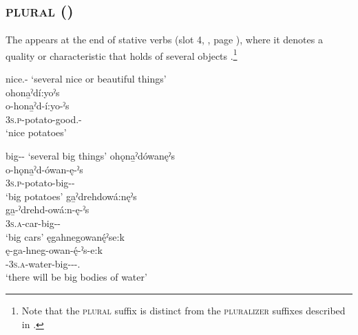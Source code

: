 \subsection{ \textsc{plural} (\plural)} \label{[-ˀs] (stative verb pluralizer)}
The  {\plural} appears at the end of stative verbs (slot 4,  , page \pageref{figtab:1:verbsuffixorder}), where it denotes a quality or characteristic that holds of several objects .\footnote{Note that the \textsc{plural} suffix is distinct from the \textsc{pluralizer} suffixes described in .}

\ea\label{ex:vpluralex2}  nice.\stative-{\plural} ‘several nice or beautiful things’\\
ohona̱ˀdí:yoˀs\\
\gll o-hona̱ˀd-í:yo-ˀs\\
 \textsc{3s.p}-potato-good.{\stative}-{\plural}\\
\glt `nice potatoes'
\z

\newpage
\ea\label{ex:vpluralex3}  big-{\stative}-{\plural} ‘several big things’
\ea ohǫna̱ˀdówanęˀs\\
\gll o-hǫna̱ˀd-ówan-ę-ˀs\\
 \textsc{3s.p}-potato-big-{\stat}-{\plural}\\
\glt `big potatoes'
\ex ga̱ˀdrehdowá:nęˀs\\
\gll ga̱-ˀdrehd-owá:n-ę-ˀs\\
 \textsc{3s.a}-car-big-{\stat}-{\plural}\\
\glt `big cars'
\ex ęgahnegowanę́ˀse:k\\
\gll ę-ga-hneg-owan-ę́-ˀs-e:k\\
 \fut-\textsc{3s.a}-water-big-{\stative}-{\plural}-{\zeropunctual.\modalizer}\\
\glt `there will be big bodies of water'
\z
\z

